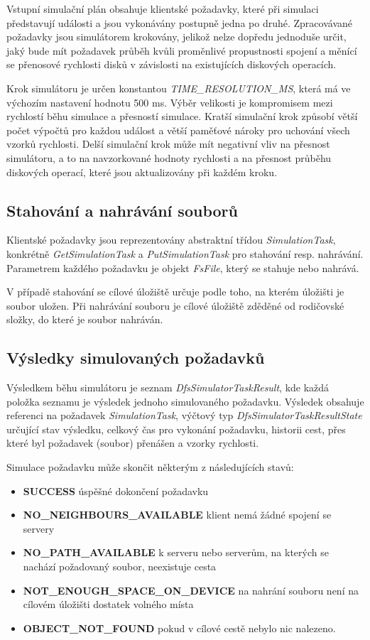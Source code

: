 \documentclass[czech,DP]{thesiskiv}
\begin{document}
Vstupní simulační plán obsahuje klientské požadavky, které při simulaci představují události a jsou vykonávány postupně jedna po druhé. Zpracovávané požadavky jsou simulátorem krokovány, jelikož nelze dopředu jednoduše určit, jaký bude mít požadavek průběh kvůli proměnlivé propustnosti spojení a měnící se přenosové rychlosti disků v závislosti na existujících diskových operacích. 

Krok simulátoru je určen konstantou \textit{TIME\_RESOLUTION\_MS}, která má ve výchozím nastavení hodnotu 500 ms. Výběr velikosti je kompromisem mezi rychlostí běhu simulace a přesností simulace. Kratší simulační krok způsobí větší počet výpočtů pro každou událost a větší paměťové nároky pro uchování všech vzorků rychlosti. Delší simulační krok může mít negativní vliv na přesnost simulátoru, a to na navzorkované hodnoty rychlosti a na přesnost průběhu diskových operací, které jsou aktualizovány při každém kroku.

\subsection{Stahování a nahrávání souborů}

Klientské požadavky jsou reprezentovány abstraktní třídou \textit{SimulationTask}, konkrétně \textit{GetSimulationTask} a \textit{PutSimulationTask} pro stahování resp. nahrávání. Parametrem každého požadavku je objekt \textit{FsFile}, který se stahuje nebo nahrává.

V případě stahování se cílové úložiště určuje podle toho, na kterém úložišti je soubor uložen. Při nahrávání souboru je cílové úložiště zděděné od rodičovské složky, do které je soubor nahráván.

\subsection{Výsledky simulovaných požadavků} \label{vysledkypozadavku}

Výsledkem běhu simulátoru je seznam \textit{DfsSimulatorTaskResult}, kde každá položka seznamu je výsledek jednoho simulovaného požadavku. Výsledek obsahuje referenci na požadavek \textit{SimulationTask}, výčtový typ \textit{DfsSimulatorTaskResultState} určující stav výsledku, celkový čas pro vykonání požadavku, historii cest, přes které byl požadavek (soubor) přenášen a vzorky rychlosti. 

\noindent Simulace požadavku může skončit některým z následujících stavů:

\begin{itemize}
\item \textbf{SUCCESS} úspěšné dokončení požadavku
\item \textbf{NO\_NEIGHBOURS\_AVAILABLE} klient nemá žádné spojení se servery
\item \textbf{NO\_PATH\_AVAILABLE} k serveru nebo serverům, na kterých se nachází požadovaný soubor, neexistuje cesta
\item \textbf{NOT\_ENOUGH\_SPACE\_ON\_DEVICE} na nahrání souboru není na cílovém úložišti dostatek volného místa
\item \textbf{OBJECT\_NOT\_FOUND} pokud v cílové cestě nebylo nic nalezeno.
\end{itemize}
\end{document}
